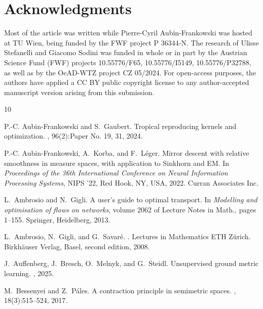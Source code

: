 \documentclass[reqno]{amsart}
\theoremstyle{plain}
\theoremstyle{remark}
\theoremstyle{plain}
\numberwithin{equation}{section}
\theoremstyle{remark}
\begin{document}
\section*{Acknowledgments} 
Most of the article was written while Pierre-Cyril
Aubin-Frankowski was hosted at TU Wien, being funded by the FWF project P 36344-N. The research of Ulisse Stefanelli and Giacomo Sodini was funded in whole or in part by the Austrian Science Fund (FWF) projects 10.55776/F65, 10.55776/I5149, 10.55776/P32788, as well as by the OeAD-WTZ project CZ  05/2024.   For open-access purposes, the authors have applied a CC BY public copyright license to any author-accepted manuscript version arising from this submission.

\newcommand{\etalchar}[1]{$^{#1}$}
\begin{thebibliography}{10}

P.-C. Aubin-Frankowski and S.~Gaubert.
\newblock Tropical reproducing kernels and optimization.
, 96(2):Paper No. 19, 31,
  2024.

P.-C. Aubin-Frankowski, A.~Korba, and F.~L\'{e}ger.
\newblock Mirror descent with relative smoothness in measure spaces, with
  application to {S}inkhorn and {EM}.
\newblock In {\em Proceedings of the 36th International Conference on Neural
  Information Processing Systems}, NIPS '22, Red Hook, NY, USA, 2022. Curran
  Associates Inc.

L.~Ambrosio and N.~Gigli.
\newblock A user's guide to optimal transport.
\newblock In {\em Modelling and optimisation of flows on networks}, volume 2062
  of {Lecture Notes in Math.}, pages 1--155. Springer, Heidelberg, 2013.

L.~Ambrosio, N.~Gigli, and G.~Savar\'e.
.
\newblock Lectures in Mathematics ETH Z\"urich. Birkh\"auser Verlag, Basel,
  second edition, 2008.


J.~Auffenberg, J.~Bresch, O.~Melnyk, and G.~Steidl.
\newblock Unsupervised ground metric learning.
, 2025.

M.~Bessenyei and Z.~P\'ales.
\newblock A contraction principle in semimetric spaces.
, 18(3):515--524, 2017.


\end{thebibliography}
\end{document}
